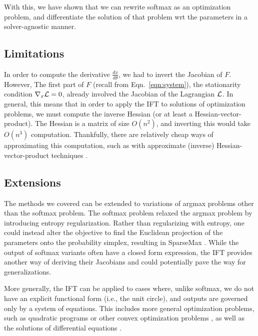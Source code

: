 \documentclass[11pt]{article}
\begin{document}
With this, we have shown that we can rewrite softmax as an optimization problem,
and differentiate the solution of that problem wrt the parameters in a solver-agnostic
manner.


\subsection{Limitations}
In order to compute the derivative $\frac{dx}{d\theta}$, we had to invert the Jacobian of $F$.
However, The first part of $F$ (recall from Eqn.~\ref{eqn:system}), the stationarity condition $\nabla_x\mathcal{L} = 0$,
already involved the Jacobian of the Lagrangian $\mathcal{L}$.
In general, this means that in order to apply the IFT to solutions of optimization problems,
we must compute the inverse Hessian (or at least a Hessian-vector-product).
The Hessian is a matrix of size $O(n^2)$, and inverting this would take $O(n^3)$ computation.
Thankfully, there are relatively cheap ways of approximating this computation,
such as with approximate (inverse) Hessian-vector-product techniques
\citep{rajeswaran2019imaml,lorraine2019hoift}.

\subsection{Extensions}
The methods we covered can be extended to variations of argmax problems
other than the softmax problem.
The softmax problem relaxed the argmax problem by introducing entropy regularization.
Rather than regularizing with entropy, one could instead alter the objective to find
the Euclidean projection of the parameters onto the probability simplex,
resulting in SparseMax \citep{sparsemax}.
While the output of softmax variants often have a closed form expression,
the IFT provides another way of deriving their Jacobians
and could potentially pave the way for generalizations.

More generally, the IFT can be applied to cases where, unlike softmax,
we do not have an explicit functional form (i.e., the unit circle),
and outputs are governed only by a system of equations.
This includes more general optimization problems, such as quadratic programs \citep{optnet}
or other convex optimization problems \citep{agrawal2019diffcvx},
as well as the solutions of differential equations \citep{neuralode}.
\end{document}
